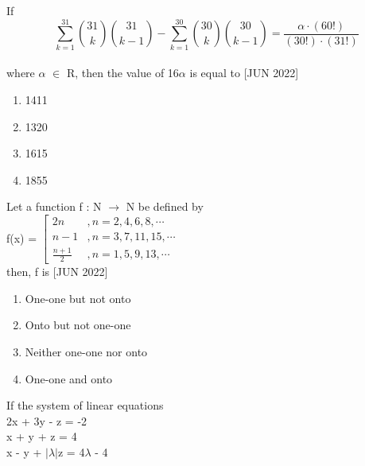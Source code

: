 \iffalse
  \title{Assignment}
  \author{ee24btech11030}
  \section{mcq-single}
\fi

\item  If\\
    
    $$ \sum_{k=1}^{31} \binom{31}{k} \binom{31}{k-1} - \sum_{k=1}^{30} \binom{30}{k} \binom{30}{k-1} = \frac{\alpha \cdot (60!)}{(30!) \cdot (31!)} $$\\ where $\alpha$ $\in$ R, then the value of 16$\alpha$ is equal to \hfill{[JUN 2022]}
    \begin{multicols}{4}
    \begin{enumerate}
        \item 1411
        \item 1320
        \item 1615
        \item 1855
    \end{enumerate}
    \end{multicols}
    \bigskip
    \item Let a function f : N $\rightarrow$ N be defined by\\
    f(x) = $\left[\begin{array}{ll}2n& , n = 2,4,6,8,\cdots\\ n - 1 & , n = 3,7,11,15,\cdots\\\frac{n + 1}{2}  &, n = 1,5,9,13,\cdots \end{array}\right.$\\
    then, f is \hfill{[JUN 2022]}
    \begin{enumerate}
        \item One-one but not onto
        \item Onto but not one-one
        \item Neither one-one nor onto
        \item One-one and onto
    \end{enumerate} 
    \bigskip
    \item If the system of linear equations\\
    2x + 3y - z = -2\\
    x + y + z = 4\\
    x - y + $|\lambda|$z = 4$\lambda$ - 4\\

